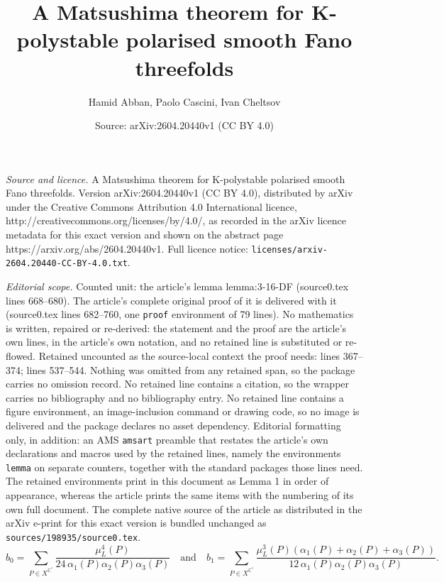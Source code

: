 \documentclass[10pt,a4paper]{amsart}
\title{A Matsushima theorem for K-polystable polarised smooth Fano threefolds}
\author{Hamid Abban, Paolo Cascini, Ivan Cheltsov}
\date{Source: arXiv:2604.20440v1 (CC BY 4.0)}
\newcommand{\C}{\mathbb{C}}
\begin{document}
\maketitle

\noindent\emph{Source and licence.} A Matsushima theorem for K-polystable polarised smooth Fano threefolds. Version arXiv:2604.20440v1 (CC BY 4.0), distributed by arXiv under the Creative Commons Attribution 4.0 International licence, http://creativecommons.org/licenses/by/4.0/, as recorded in the arXiv licence metadata for this exact version and shown on the abstract page https://arxiv.org/abs/2604.20440v1. Full licence notice: \texttt{licenses/arxiv-2604.20440-CC-BY-4.0.txt}.\par\smallskip

\noindent\textit{Editorial scope.} Counted unit: the article's lemma lemma:3-16-DF (source0.tex lines 668--680). The article's complete original proof of it is delivered with it (source0.tex lines 682--760, one \texttt{proof} environment of 79 lines). No mathematics is written, repaired or re-derived: the statement and the proof are the article's own lines, in the article's own notation, and no retained line is substituted or re-flowed.  Retained uncounted as the source-local context the proof needs: lines 367--374; lines 537--544.  Nothing was omitted from any retained span, so the package carries no omission record.  No retained line contains a citation, so the wrapper carries no bibliography and no bibliography entry.  No retained line contains a figure environment, an image-inclusion command or drawing code, so no image is delivered and the package declares no asset dependency.  Editorial formatting only, in addition: an AMS \texttt{amsart} preamble that restates the article's own declarations and macros used by the retained lines, namely the environments \texttt{lemma} on separate counters, together with the standard packages those lines need.  The retained environments print in this document as Lemma 1 in order of appearance, whereas the article prints the same items with the numbering of its own full document.  The complete native source of the article as distributed in the arXiv e-print for this exact version is bundled unchanged as \texttt{sources/198935/source0.tex}.
\begin{equation}
\label{equation:ab}
b_0=\sum_{P\in X^{\C^*}}\frac{\mu^4_L(P)}{24\,\alpha_{1}(P)\alpha_{2}(P)\alpha_{3}(P)}
\quad
\text{and}
\quad
b_1=\sum_{P\in X^{\C^*}}\frac{\mu^3_L(P)(\alpha_{1}(P)+\alpha_{2}(P)+\alpha_{3}(P))}{12\,\alpha_{1}(P)\alpha_{2}(P)\alpha_{3}(P)}.
\end{equation}
\end{document}
